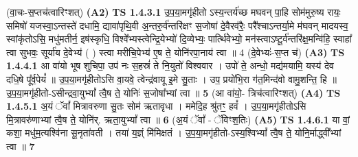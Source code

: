 \documentclass[17pt]{extarticle}
\begin{document}
                  \newline
                      (वा॒चः-स॒प्तच॑त्वारिꣳशत्)  \textbf{(A2)} \newline \newline
                                        \textbf{ TS 1.4.3.1} \newline
                  उ॒प॒या॒मगृ॑हीतो ऽस्य॒न्तर्य॑च्छ मघवन् पा॒हि सोम॑मुरु॒ष्य रायः॒ समिषो॑ यजस्वा॒ऽन्तस्ते॑ दधामि॒ द्यावा॑पृथि॒वी अ॒न्तरु॒र्व॑न्तरि॑क्षꣳ स॒जोषा॑ दे॒वैरव॑रैः॒ परै᳚श्चाऽन्तर्या॒मे म॑घवन् मादयस्व॒ स्वांकृ॑तोऽसि॒ मधु॑मतीर्न॒ इष॑स्कृधि॒ विश्वे᳚भ्यस्त्वेन्द्रि॒येभ्यो॑ दि॒व्येभ्यः॒ पार्त्थि॑वेभ्यो॒ मन॑स्त्वाऽष्टू॒र्व॑न्तरि॑क्ष॒मन्वि॑हि॒ स्वाहा᳚ त्वा सुभवः॒ सूर्या॑य दे॒वेभ्य॑ ( ) स्त्वा मरीचि॒पेभ्य॑ ए॒ष ते॒ \textbf{ } \newline
                  \newline
                      योनि॑रपा॒नाय॑ त्वा ॥ 4 (दे॒वेभ्यः॑-स॒प्त च॑)  \textbf{(A3)} \newline \newline
                                        \textbf{ TS 1.4.4.1} \newline
                  आ वा॑यो भूष शुचिपा॒ उप॑ नः स॒हस्रं॑ ते नि॒युतो॑ विश्ववार । उपो॑ ते॒ अन्धो॒ मद्य॑मयामि॒ यस्य॑ देव दधि॒षे पू᳚र्व॒पेयं᳚ ॥ उ॒प॒या॒मगृ॑हीतोऽसि वा॒यवे॒ त्वेन्द्र॑वायू इ॒मे सु॒ताः । उप॒ प्रयो॑भि॒रा ग॑त॒मिन्द॑वो वामु॒शन्ति॒ हि ॥ उ॒प॒या॒मगृ॑हीतो-ऽसीन्द्रवा॒युभ्यां᳚ त्वै॒ष ते॒ योनिः॑ स॒जोषा᳚भ्यां त्वा ॥ \textbf{  5} \newline
                  \newline
                      (आ वा॑यो॒- त्रिच॑त्वारिꣳशत्)  \textbf{(A4)} \newline \newline
                                        \textbf{ TS 1.4.5.1} \newline
                  अ॒यं ॅवां᳚ मित्रावरुणा सु॒तः सोम॑ ऋतावृधा । ममेदि॒ह श्रु॑तꣳ॒॒ हवं᳚ । उ॒प॒या॒मगृ॑हीतोऽसि मि॒त्रावरु॑णाभ्यां त्वै॒ष ते॒ योनि॑र्. ऋता॒युभ्यां᳚ त्वा ॥ \textbf{  6 } \newline
                  \newline
                      (अ॒यं ॅवां᳚ - ॅविꣳश॒तिः)  \textbf{(A5)} \newline \newline
                                        \textbf{ TS 1.4.6.1} \newline
                  या वां॒ कशा॒ मधु॑म॒त्यश्वि॑ना सू॒नृता॑वती । तया॑ य॒ज्ञ्ं मि॑मिक्षतं । उ॒प॒या॒मगृ॑हीतो-ऽस्य॒श्विभ्यां᳚ त्वै॒ष ते॒ योनि॒र्माद्ध्वी᳚भ्यां त्वा ॥ \textbf{  7 } \newline
\end{document}
